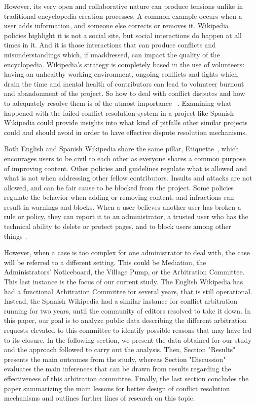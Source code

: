 \documentclass{sigchi}
\begin{document}
However, its very open and collaborative nature can produce tensions unlike in traditional
encyclopedia-creation processes. A common example occurs when a user adds information, and 
someone else corrects or removes it. Wikipedia policies highlight it is not a social site, 
but social interactions do happen at all times in it. And it is those interactions that can
produce conflicts and misunderstandings which, if unaddressed, can impact the quality of the
encyclopedia. Wikipedia’s strategy is completely based in the use of volunteers: having an
unhealthy working environment, ongoing conflicts and fights which drain the time and mental 
health of contributors can lead to volunteer burnout and abandonment of the project. So how 
to deal with conflict disputes and how to adequately resolve them is of the utmost importance 
~\cite{kittur2010}. Examining what happened with the failed conflict resolution system in a project like 
Spanish Wikipedia could provide insights into what kind of pitfalls other similar projects 
could and should avoid in order to have effective dispute resolution mechanisms.

Both English and Spanish Wikipedia share the same pillar, Etiquette~\cite{wiki:wikidata}, which encourages 
users to be civil to each other as everyone shares a common purpose of improving content. 
Other policies and guidelines regulate what is allowed and what is not when addressing other
fellow contributors\cite{butler2008, morgan2010}. Insults and attacks are not 
allowed, and can be fair cause to be
blocked from the project. Some policies regulate the behavior when adding or removing content, 
and infractions can result in warnings and blocks. When a user believes another user has broken 
a rule or policy, they can report it to an administrator, a trusted user who has the technical
ability to delete or protect pages, and to block users among other things~\cite{wiki:userlevels}. 

However, when a case is too complex for one administrator to deal with, the case will be 
referred to a different
setting. This could be Mediation, the Administrators’ Noticeboard, the Village Pump, or the
Arbitration Committee. This last instance is the focus of our current study. The English 
Wikipedia has had a functional Arbitration Committee for several years, that is still operational. 
Instead, the Spanish Wikipedia had a similar instance for conflict arbitration running for two 
years, until the community of editors resolved to take it down. In this paper, our goal is to
analyze public data describing the different arbitration requests elevated to this committee to
identify possible reasons that may have led to its closure. In the following section, we present
the data obtained for our study and the approach followed to carry out the analysis. Then,
Section "Results" presents the main outcomes from the study, whereas Section "Discussion" evaluates
the main inferences that can be drawn from results regarding the effectiveness of this arbitration
committee. Finally, the last section concludes the paper summarizing the main lessons for better
design of conflict resolution mechanisms and outlines further lines of research on this topic.
\end{document}
